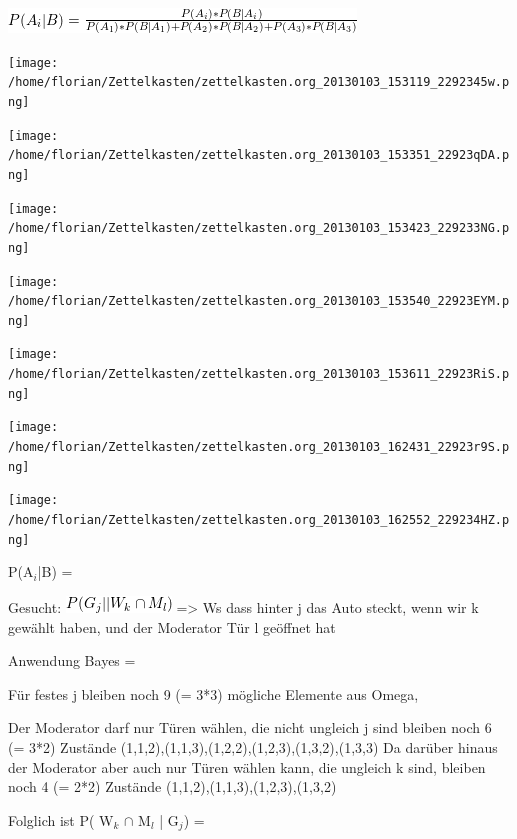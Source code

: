\documentclass[11pt]{article}
\begin{document}
\begin{itemize}
\includegraphics[width=.9\linewidth]{201301ad-19123649498Bz.png}


\texttt{[image: /home/florian/Zettelkasten/zettelkasten.org\_20130103\_153119\_2292345w.png]}

\texttt{[image: /home/florian/Zettelkasten/zettelkasten.org\_20130103\_153351\_22923qDA.png]}

\texttt{[image: /home/florian/Zettelkasten/zettelkasten.org\_20130103\_153423\_229233NG.png]}

\texttt{[image: /home/florian/Zettelkasten/zettelkasten.org\_20130103\_153540\_22923EYM.png]}

\texttt{[image: /home/florian/Zettelkasten/zettelkasten.org\_20130103\_153611\_22923RiS.png]}

\texttt{[image: /home/florian/Zettelkasten/zettelkasten.org\_20130103\_162431\_22923r9S.png]}

\texttt{[image: /home/florian/Zettelkasten/zettelkasten.org\_20130103\_162552\_229234HZ.png]}

P(A$_i$|B) = 


Gesucht: \includegraphics[width=.9\linewidth]{201301ad-1914034949uLC.png}  => Ws dass hinter j das Auto steckt, wenn wir k gewählt haben, und der Moderator Tür l geöffnet hat



Anwendung Bayes
= 

Für festes j bleiben noch 9 (= 3*3) mögliche Elemente aus Omega,

Der Moderator darf nur Türen wählen, die nicht ungleich j sind bleiben noch 6 (= 3*2) Zustände
(1,1,2),(1,1,3),(1,2,2),(1,2,3),(1,3,2),(1,3,3)
Da darüber hinaus der Moderator aber auch nur Türen wählen kann, die ungleich k sind, bleiben noch 4 (= 2*2) Zustände
(1,1,2),(1,1,3),(1,2,3),(1,3,2)

Folglich ist P( W$_k$ $\cap$ M$_l$ | G$_j$) = 



\end{itemize}
\end{document}

